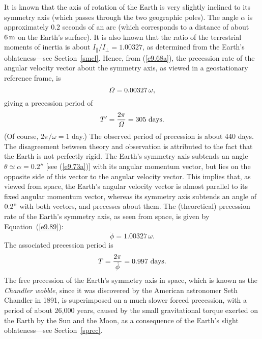 It is known that the axis of rotation of the Earth is  very slightly inclined to
its symmetry axis (which passes through the two geographic poles). The angle $\alpha$ is approximately $0.2$ seconds of an arc
(which corresponds to a distance of about $6\,{\rm m}$ on the Earth's surface).
It is also known that the ratio of the terrestrial moments of inertia 
is about $I_\parallel/I_\perp=1.00327$, as determined from the
Earth's oblateness---see Section~\ref{smcl}. Hence, from (\ref{e9.68a}), the precession rate of the
angular velocity vector about the symmetry axis, as viewed in a geostationary reference frame, is
\begin{equation}
{\mit\Omega} = 0.00327\,\omega,
\end{equation}
giving a precession period of
\begin{equation}
T'= \frac{2\pi}{{\mit\Omega}} = 305\,\,{\rm days}.
\end{equation}
(Of course, $2\pi/\omega = 1$ day.)
The observed period of precession is about 440 days. The disagreement
between theory and observation is attributed to the fact that the Earth
is not perfectly rigid. 
The Earth's symmetry axis subtends an angle $\theta\simeq \alpha = 0.2''$ [see (\ref{e9.73a})] with 
its  angular momentum vector, but lies on the opposite side of this vector to the angular velocity vector. 
This implies that, as viewed from space, the Earth's angular velocity vector is almost parallel to its
fixed angular momentum vector, whereas its symmetry axis subtends an angle of $0.2"$ with both vectors, and
precesses about them.
The (theoretical) precession rate of the Earth's symmetry
axis, as seen from space, is given by Equation~(\ref{e9.89}):
\begin{equation}
\dot{\phi} = 1.00327\,\omega.
\end{equation}
The associated precession period is
\begin{equation}
T = \frac{2\pi}{\dot{\phi}} = 0.997\,\,{\rm days}.
\end{equation}
The free precession of the Earth's symmetry axis in space, which is  known as the {\em Chandler wobble}, since it
was discovered by the American astronomer Seth Chandler in 1891, 
 is superimposed on
a much slower  forced precession, with a period of about 26,000 years, caused by
the small gravitational torque exerted on the Earth by the Sun and the
Moon, as a consequence of the Earth's slight oblateness---see Section~\ref{sprec}. 

